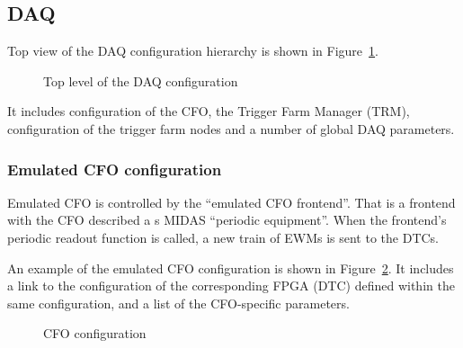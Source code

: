 \subsection{DAQ}
Top view of the DAQ configuration hierarchy is shown in Figure~\ref{figure:daq_config}.

\begin{figure}[H]
  \caption{
    \label{figure:daq_config}
    Top level of the DAQ configuration
  }
\end{figure}

It includes configuration of the CFO, the Trigger Farm Manager (TRM), configuration
of the trigger farm nodes and a number of global DAQ parameters.


\newpage
\subsubsection{Emulated CFO configuration}
Emulated CFO is controlled by the ``emulated CFO frontend''.
That is a frontend with the CFO described a s MIDAS ``periodic equipment''.
When the frontend's periodic readout function is called, a new train of EWMs
is sent to the DTCs.

An example of the emulated CFO configuration is shown in Figure~\ref{figure:cfo_config}.
It includes a link to the configuration of the corresponding FPGA (DTC) 
defined within the same configuration, and a list of the CFO-specific parameters.

\begin{figure}[H]
  \caption{
    \label{figure:cfo_config}
    CFO configuration
  }
\end{figure}

